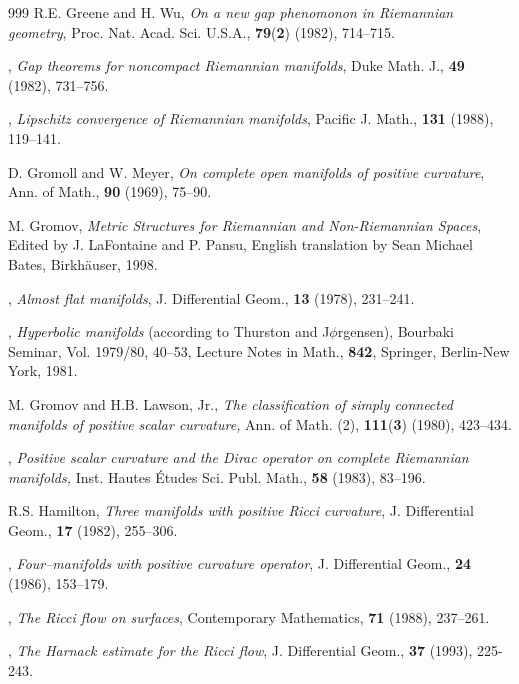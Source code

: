 \begin{thebibliography}{999}
R.E. Greene and H. Wu,
{\it On a new gap phenomonon in Riemannian geometry}, Proc. Nat.
Acad. Sci. U.S.A., \textbf{79}({\bf 2}) (1982), 714--715.

 \bysame,
{\it Gap theorems for noncompact Riemannian manifolds}, Duke Math.
J., \textbf{49} (1982), 731--756.

 \bysame,
{\it Lipschitz convergence of Riemannian manifolds}, Pacific J.
Math., \textbf{131} (1988), 119--141.

D. Gromoll and W. Meyer,
{\it On complete open manifolds of positive curvature}, Ann. of
Math., \textbf{90} (1969), 75--90.

M. Gromov,
{\it Metric Structures for Riemannian and Non-Riemannian Spaces},
Edited by J. LaFontaine and P. Pansu, English translation by Sean
Michael Bates, Birkh\"{a}user, 1998.

 \bysame,
{\it Almost flat manifolds}, J. Differential Geom., \textbf{13}
(1978), 231--241.

 \bysame,
{\it Hyperbolic manifolds} (according to Thurston and
J$\phi$rgensen), Bourbaki Seminar, Vol. 1979/80, 40--53, Lecture
Notes in Math., \textbf{842}, Springer, Berlin-New York, 1981.

M. Gromov and H.B. Lawson, Jr.,
{\it The classification of simply connected manifolds of positive
scalar curvature,} Ann. of Math. (2), \textbf{111}({\bf 3})
(1980), 423--434.

 \bysame,
{\it Positive scalar curvature and the Dirac operator on complete
Riemannian manifolds,} Inst. Hautes \'{E}tudes Sci. Publ. Math.,
\textbf{58} (1983), 83--196.

 R.S. Hamilton,
{\it Three manifolds with positive Ricci curvature}, J.
Differential Geom., {\bf 17} (1982), 255--306.

 \bysame,
{\it Four--manifolds with positive curvature operator}, J.
Differential Geom., {\bf 24} (1986), 153--179.

 \bysame,
{\it The Ricci flow on surfaces}, Contemporary Mathematics, {\bf
71} (1988), 237--261.

 \bysame,
{\it The Harnack estimate for the Ricci flow}, J. Differential
Geom., {\bf 37} (1993), 225-243.


\end{thebibliography}
